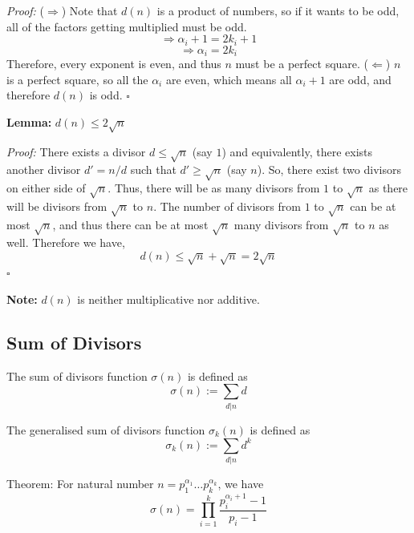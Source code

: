 \documentclass[a4paper,11pt,abstracton]{scrartcl}
\theoremstyle{dotlessP}
\theoremstyle{dotlessS}
\theoremstyle{remark}
\theoremstyle{definition}
\begin{document}
\begin{claim_box}
\textit{Proof:} ($\Rightarrow$)
Note that $d(n)$ is a product of numbers, so if it wants to be odd, all of the factors getting multiplied must be odd. 
$$\Rightarrow \alpha_i+1 = 2k_i+1$$ 
$$\Rightarrow \alpha_i = 2k_i$$
Therefore, every exponent is even, and thus $n$ must be a perfect square.
($\Leftarrow$)
$n$ is a perfect square, so all the $\alpha_i$ are even, which means all $\alpha_i +1$ are odd, and therefore $d(n)$ is odd.
\hfill$\square$
\end{claim_box}

\begin{claim_box}
\textbf{Lemma:}
$d(n) \le 2\sqrt{n}$
\end{claim_box}

\begin{claim_box}
\textit{Proof:} 
There exists a divisor $d \le \sqrt{n}$ (say $1$)  and equivalently, there exists another divisor $d'=n/d$ such that $d' \ge \sqrt{n}$ (say $n$). So, there exist two divisors on either side of $\sqrt{n}$. Thus, there will be as many divisors from $1$ to $\sqrt{n}$ as there will be divisors from $\sqrt{n}$ to $n$. The number of divisors from $1$ to $\sqrt{n}$ can be at most $\sqrt{n}$, and thus there can be at most $\sqrt{n}$ many divisors from $\sqrt{n}$ to $n$ as well. Therefore we have,
$$d(n) \le \sqrt{n} + \sqrt{n} = 2\sqrt{n}$$
\hfill$\square$
\end{claim_box}

\textbf{Note:} $d(n)$ is neither multiplicative nor additive.

\subsection{Sum of Divisors}

\begin{definition_box}
The sum of divisors function $\sigma (n)$ is defined as
$$\sigma (n) := \sum_{d|n} d$$
\end{definition_box}

\begin{definition_box}
The generalised sum of divisors function $\sigma_k (n)$ is defined as
$$\sigma_k (n) := \sum_{d|n} d^k$$
\end{definition_box}

\begin{mainbox}{Theorem:}
For natural number $n=p_1^{\alpha_1} \dots p_k^{\alpha_k}$, we have 
$$\sigma(n)=\prod_{i=1}^{k}\frac{p_i^{\alpha_i+1}-1}{p_i-1}$$
\end{mainbox}
\end{document}

